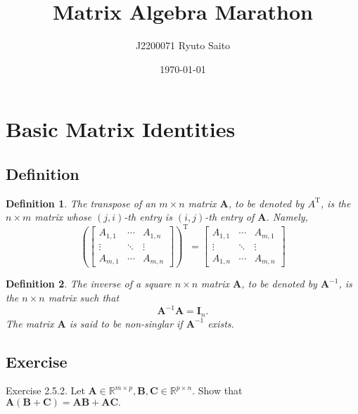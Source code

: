 \documentclass{article}
\title{Matrix Algebra Marathon}
\author{J2200071 Ryuto Saito}
\date{\today}
\theoremstyle{plain}
\newtheorem{dfn}{Definition}[subsection]
\begin{document}
\maketitle

\section{Basic Matrix Identities}

\subsection{Definition}

\begin{dfn}
	The transpose of an $m \times n$ matrix $\bm{A}$, to be denoted by $A^\mathrm{T}$,
	is the $n \times m$ matrix whose $(j , i)$-th entry is $(i , j)$-th  entry of $\bm{A}$. Namely,
	\begin{equation}
		\left(
		\begin{bmatrix}
			A_{1,1} & \cdots & A_{1,n} \\
			\vdots & \ddots & \vdots \\
			A_{m,1} & \cdots & A_{m,n}
		\end{bmatrix}
		\right)^\mathrm{T}
		=
		\begin{bmatrix}
			A_{1,1} & \cdots & A_{m,1} \\
			\vdots & \ddots & \vdots \\
			A_{1,n} & \cdots & A_{m,n}
		\end{bmatrix}
	\end{equation}
\end{dfn}

\begin{dfn}
	The inverse of a square $n \times n$ matrix $\bm{A}$, to be denoted by $\bm{A}^{-1}$, is the $n \times n$ matrix such that
	\begin{equation}
		\bm{A}^{-1} \bm{A} = \bm{I}_n .
	\end{equation}
	The matrix $\bm{A}$ is said to be non-singlar if $\bm{A}^{-1}$ exists.
\end{dfn}


\subsection{Exercise}

\begin{itembox}[l]{Exercise 2.5.2.}
	Let
	\begin{math}
		\bm{A} \in \mathbb{R}^{m \times p} , \bm{B} , \bm{C} \in \mathbb{R}^{p \times n} .
	\end{math}
	Show that
	\begin{math}
		\bm{A} (\bm{B} + \bm{C}) = \bm{AB} + \bm{AC} .
	\end{math}

\end{itembox}
\end{document}
